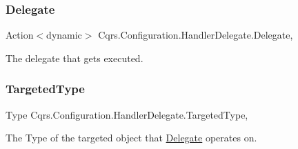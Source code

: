 \subsubsection{\texorpdfstring{Delegate}{Delegate}}
{\footnotesize\ttfamily Action$<$dynamic$>$ Cqrs.\+Configuration.\+Handler\+Delegate.\+Delegate\hspace{0.3cm}{\ttfamily [get]}, {\ttfamily [set]}}



The delegate that gets executed. 

\mbox{\label{classCqrs_1_1Configuration_1_1HandlerDelegate_ac88ee4620ae81fa214a562be2ce867f1_ac88ee4620ae81fa214a562be2ce867f1}} 
\subsubsection{\texorpdfstring{Targeted\+Type}{TargetedType}}
{\footnotesize\ttfamily Type Cqrs.\+Configuration.\+Handler\+Delegate.\+Targeted\+Type\hspace{0.3cm}{\ttfamily [get]}, {\ttfamily [set]}}



The Type of the targeted object that \hyperlink{classCqrs_1_1Configuration_1_1HandlerDelegate_a67fe9f218e3202af02319f33483edb20_a67fe9f218e3202af02319f33483edb20}{Delegate} operates on. 

